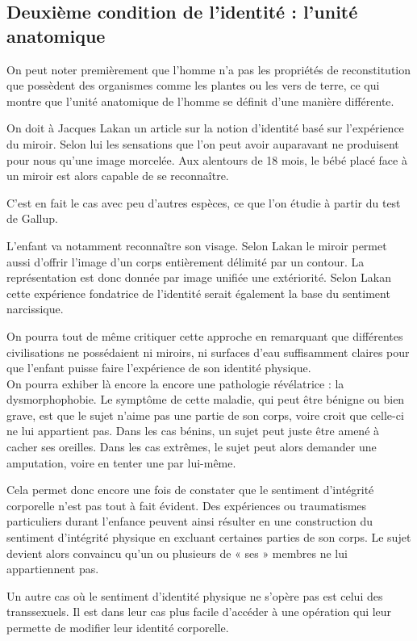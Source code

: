 \subsection{Deuxième condition de l'identité : l'unité anatomique}
	On peut noter premièrement que l'homme n'a pas les propriétés de reconstitution que possèdent des organismes comme les plantes ou les vers de terre, ce qui montre que l'unité anatomique de l'homme se définit d'une manière différente.

	On doit à Jacques Lakan un article sur la notion d'identité basé sur l'expérience du miroir.
	Selon lui les sensations que l'on peut avoir auparavant ne produisent pour nous qu'une image morcelée.
	Aux alentours de 18 mois, le bébé placé face à un miroir est alors capable de se reconnaître.

	C'est en fait le cas avec peu d'autres espèces, ce que l'on étudie à partir du test de Gallup.

	L'enfant va notamment reconnaître son visage.
	Selon Lakan le miroir permet aussi d'offrir l'image d'un corps entièrement délimité par un contour.
	La représentation est donc donnée par image unifiée une extériorité.
	Selon Lakan cette expérience fondatrice de l'identité serait également la base du sentiment narcissique.

	On pourra tout de même critiquer cette approche en remarquant que différentes civilisations ne possédaient ni miroirs, ni surfaces d'eau suffisamment claires pour que l'enfant puisse faire l'expérience de son identité physique.\\

	On pourra exhiber là encore la encore une pathologie révélatrice : la dysmorphophobie.
	Le symptôme de cette maladie, qui peut être bénigne ou bien grave, est que le sujet n'aime pas une partie de son corps, voire croit que celle-ci ne lui appartient pas.
	Dans les cas bénins, un sujet peut juste être amené à cacher ses oreilles.
	Dans les cas extrêmes, le sujet peut alors demander une amputation, voire en tenter une par lui-même.

	Cela permet donc encore une fois de constater que le sentiment d'intégrité corporelle n'est pas tout à fait évident.
	Des expériences ou traumatismes particuliers durant l'enfance peuvent ainsi résulter en une construction du sentiment d'intégrité physique en excluant certaines parties de son corps.
	Le sujet devient alors convaincu qu'un ou plusieurs de « ses » membres ne lui appartiennent pas.

	Un autre cas où le sentiment d'identité physique ne s'opère pas est celui des transsexuels.
	Il est dans leur cas plus facile d'accéder à une opération qui leur permette de modifier leur identité corporelle.

